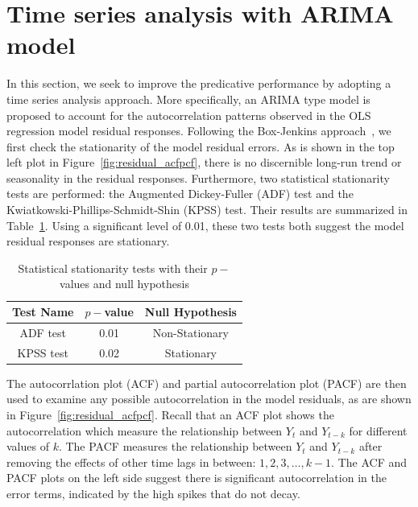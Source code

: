 \documentclass [11pt, proquest] {uwthesis}[2015/03/03]
\begin{document}
\section{Time series analysis with ARIMA model}

In this section, we seek to improve the predicative performance by adopting a time series analysis approach. More specifically, an ARIMA type model is proposed to account for the autocorrelation patterns observed in the OLS regression model residual responses. Following the Box-Jenkins approach~\cite{Jenkins70}, we first check the stationarity of the model residual errors. As is shown in the top left plot in Figure~\ref{fig:residual_acfpcf}, there is no discernible long-run trend or seasonality in the residual responses. Furthermore, two statistical stationarity tests are performed: the Augmented Dickey-Fuller (ADF) test and the Kwiatkowski-Phillips-Schmidt-Shin (KPSS) test. Their results are summarized in Table~\ref{tbl:stationarytest}. Using a significant level of 0.01, these two tests both suggest the model residual responses are stationary.

\begin{table}
 \centering 
  \label{tbl:stationarytest} 
\small
\begin{tabular}{ c | c | c} 
\hline 
  Test Name & $p-$value & Null Hypothesis \\ 
\hline
  ADF test  & 0.01  &  Non-Stationary \\ 
  KPSS test & 0.02 & Stationary \\ 
\hline 
\end{tabular} 
\caption{Statistical stationarity tests with their $p-$values and null hypothesis} 
\vspace{-.2in}
\end{table} 

The autocorrlation plot (ACF) and partial autocorrelation plot (PACF) are then used to examine any possible autocorrelation in the model residuals, as are shown in Figure~\ref{fig:residual_acfpcf}. Recall that an ACF plot shows the autocorrelation which measure the relationship between $Y_t$ and $Y_{t-k}$ for different values of $k$.  The PACF measures the relationship between $Y_t$ and $Y_{t-k}$ after removing the effects of other time lags in between: $1, 2, 3, \hdots, k-1$. The ACF and PACF plots on the left side suggest there is significant autocorrelation in the error terms, indicated by the high spikes that do not decay.
\end{document}
